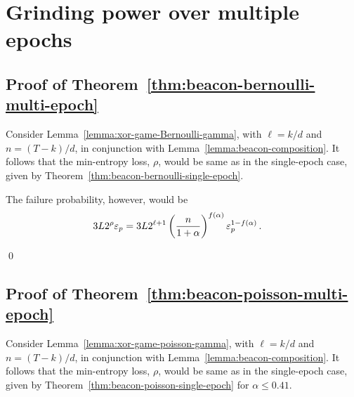 




\section{Grinding power over multiple epochs}

\subsection*{Proof of Theorem~\ref{thm:beacon-bernoulli-multi-epoch}}
  Consider Lemma~\ref{lemma:xor-game-Bernoulli-gamma}, 
  with $\ell = k/d$ and $n = (T-k)/d$, 
  in conjunction with Lemma~\ref{lemma:beacon-composition}.
  It follows that the min-entropy loss, $\rho$, 
  would be same as in the single-epoch case, 
  given by Theorem~\ref{thm:beacon-bernoulli-single-epoch}.

  The failure probability, however, would be 
  \begin{align*}
    3 L 2^\rho \mathsf{\varepsilon}_p
    &= 3 L 2^{\ell + 1} 
      \left(\frac{n}{1+\alpha}\right)^{f(\alpha)} 
      \mathsf{\varepsilon}_p^{1 - f(\alpha)}
      \,.
  \end{align*}
  
\hfill\qed


\subsection*{Proof of Theorem~\ref{thm:beacon-poisson-multi-epoch}}
  Consider Lemma~\ref{lemma:xor-game-poisson-gamma}, 
  with $\ell = k/d$ and $n = (T-k)/d$, 
  in conjunction with Lemma~\ref{lemma:beacon-composition}.
  It follows that the min-entropy loss, $\rho$, 
  would be same as in the single-epoch case, 
  given by Theorem~\ref{thm:beacon-poisson-single-epoch} 
  for $\alpha \leq 0.41$.









